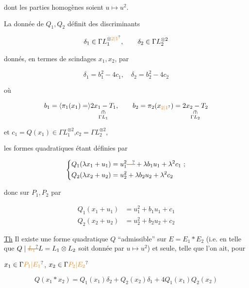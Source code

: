 dont les parties homogènes soient $u\longmapsto u^2$.

La donnée de $Q_1,Q_2$ définit des discriminants


\[ \delta_1\in\Gamma L_1^{\otimes\unsure{2|1}},\qquad\delta_2\in\Gamma L_{2}^{\otimes2} \]

donnés, en termes de scindages  $x_1,x_2$, par

\[ \delta_1=b_1^2-4c_1,\quad\delta_2=b_2^2-4c_2 \]

où

\[ b_1=\inserted{\pi_1(x_1)=}\underset{\substack{\rotatebox{-90}{$\in$}\\\Gamma L_1}}{2x_1-T_1},\qquad b_2=\pi_2(x_{\unsure{2|1}})=\underset{\substack{\rotatebox{-90}{$\in$}\\\Gamma L_2}}{2x_2-T_2} \]

et \quad $c_1=Q(x_1)\in\Gamma L_1^{\otimes2}$,\quad $c_2=\Gamma L_2^{\otimes2}$,

les formes quadratiques  étant définies par

\[ \left\{\begin{aligned}Q_1(\lambda x_1+u_1)&=u_1^2\deleted{\unsure{-}}+\lambda b_1 u_1+\lambda^2 c_1\ ;\\ Q_2(\lambda x_2+u_2)&=u_2^2+\lambda b_2 u_2+\lambda^2c_2\end{aligned}\right. \]

donc sur $P_1,P_2$ par

\[ \begin{aligned}Q_1(x_1+u_1)&=u_1^2+b_1u_1+c_1\\Q_2(x_2+u_2)&=u_2^2+b_2u_2+c_2\end{aligned} \]

\uline{Th} Il existe une forme quadratique $Q$ ``admissible'' sur $E=E_1*E_2$  (i.e. en telle que $Q\mid\deleted{\unsure{L_1}} L=L_1\otimes L_2$  soit donnée par $u\longmapsto u^2$) et  seule, telle que l'on ait, pour

$x_1\in\Gamma \unsure{P_1|E_1}$, $x_2\in\Gamma \unsure{P_2|E_2}$ 

\[ \boxed{Q(x_1*x_2)=Q_1(x_1)\delta_2+Q_2(x_2)\delta_1+4Q_1(x_1)Q_2(x_2)} \]


